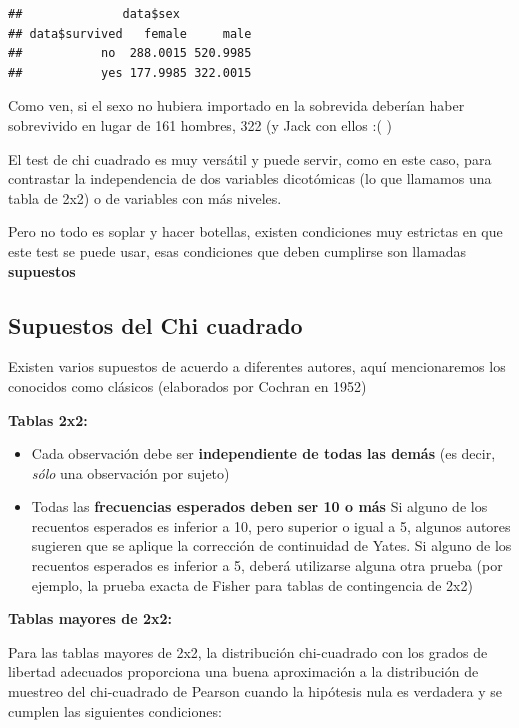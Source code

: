 \documentclass[
]{book}
\begin{document}
\begin{verbatim}
##              data$sex
## data$survived   female     male
##           no  288.0015 520.9985
##           yes 177.9985 322.0015
\end{verbatim}

Como ven, si el sexo no hubiera importado en la sobrevida deberían haber sobrevivido en lugar de 161 hombres, 322 (y Jack con ellos :( )

El test de chi cuadrado es muy versátil y puede servir, como en este caso, para contrastar la independencia de dos variables dicotómicas (lo que llamamos una tabla de 2x2) o de variables con más niveles.

Pero no todo es soplar y hacer botellas, existen condiciones muy estrictas en que este test se puede usar, esas condiciones que deben cumplirse son llamadas \textbf{supuestos}

\hypertarget{supuestos-del-chi-cuadrado}{%
\subsection{Supuestos del Chi cuadrado}\label{supuestos-del-chi-cuadrado}}

Existen varios supuestos de acuerdo a diferentes autores, aquí mencionaremos los conocidos como clásicos (elaborados por Cochran en 1952)

\textbf{Tablas 2x2:}

\begin{itemize}
\item
  Cada observación debe ser \textbf{independiente de todas las demás} (es decir, \emph{sólo} una observación por sujeto)
\item
  Todas las \textbf{frecuencias esperados deben ser 10 o más} Si alguno de los recuentos esperados es inferior a 10, pero superior o igual a 5, algunos autores sugieren que se aplique la corrección de continuidad de Yates. Si alguno de los recuentos esperados es inferior a 5, deberá utilizarse alguna otra prueba (por ejemplo, la prueba exacta de Fisher para tablas de contingencia de 2x2)
\end{itemize}

\textbf{Tablas mayores de 2x2:}

Para las tablas mayores de 2x2, la distribución chi-cuadrado con los grados de libertad adecuados proporciona una buena aproximación a la distribución de muestreo del chi-cuadrado de Pearson cuando la hipótesis nula es verdadera y se cumplen las siguientes condiciones:
\end{document}
